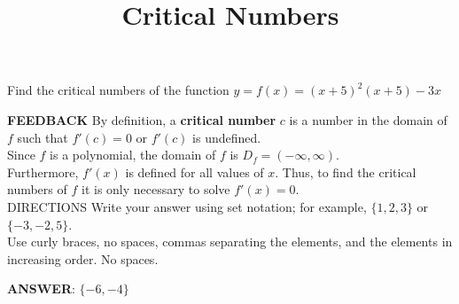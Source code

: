 \documentclass{ximera}
\title{Critical Numbers}
\begin{document}
\maketitle

 Find the critical numbers of the function  \(\displaystyle   y = f(x) = (x+5)^2\left(x+5\right)-3x\)
	  
\textbf{FEEDBACK} 	By definition, a \textbf{critical number} \(c\) is a number in the domain of \(f\) such that \(f'(c)=0\) or     \(f'(c)\) is undefined.  
\\Since \(f\) is a polynomial, the domain of \(f\) is \( D_f = (-\infty, \infty)\).   
\\Furthermore, \(f'(x)\) is defined for all values of \(x\). Thus, to find the critical numbers of \(f\) it is only necessary to solve \(f'(x)=0\). 	  \\DIRECTIONS   	Write your answer using set notation; for example, \(\{1,2,3\}\) or \(\{-3,-2,5\}\).  
\\ Use curly braces, no spaces, commas separating the elements, and the elements in increasing order. No spaces.

\textbf{ANSWER}:  	\(\{-6,-4\}\)
\end{document}
